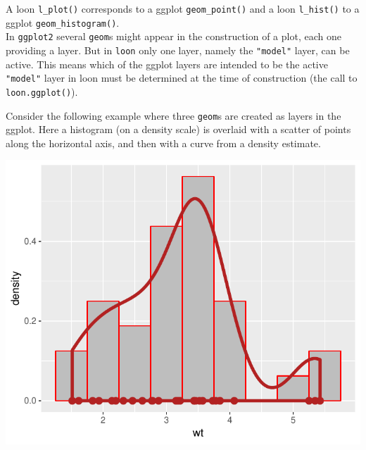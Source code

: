 \documentclass[]{article}
\newenvironment{Shaded}{\begin{snugshade}}{\end{snugshade}}
\newcommand{\KeywordTok}[1]{\textcolor[rgb]{0.13,0.29,0.53}{\textbf{#1}}}
\newcommand{\DataTypeTok}[1]{\textcolor[rgb]{0.13,0.29,0.53}{#1}}
\newcommand{\DecValTok}[1]{\textcolor[rgb]{0.00,0.00,0.81}{#1}}
\newcommand{\FloatTok}[1]{\textcolor[rgb]{0.00,0.00,0.81}{#1}}
\newcommand{\StringTok}[1]{\textcolor[rgb]{0.31,0.60,0.02}{#1}}
\newcommand{\CommentTok}[1]{\textcolor[rgb]{0.56,0.35,0.01}{\textit{#1}}}
\newcommand{\OperatorTok}[1]{\textcolor[rgb]{0.81,0.36,0.00}{\textbf{#1}}}
\newcommand{\NormalTok}[1]{#1}
\begin{document}
A loon \texttt{l\_plot()} corresponds to a ggplot \texttt{geom\_point()}
and a loon \texttt{l\_hist()} to a ggplot \texttt{geom\_histogram()}.\\
In \texttt{ggplot2} several \texttt{geom}s might appear in the
construction of a plot, each one providing a layer. But in \texttt{loon}
only one layer, namely the \texttt{"model"} layer, can be active. This
means which of the ggplot layers are intended to be the active
\texttt{"model"} layer in loon must be determined at the time of
construction (the call to \texttt{loon.ggplot()}).

Consider the following example where three \texttt{geom}s are created as
layers in the ggplot. Here a histogram (on a density scale) is overlaid
with a scatter of points along the horizontal axis, and then with a
curve from a density estimate.

\begin{Shaded}
\end{Shaded}

\begin{center}\includegraphics[width=0.7\linewidth]{ggplots2loon_files/figure-latex/multiple geoms-1} \end{center}
\end{document}
